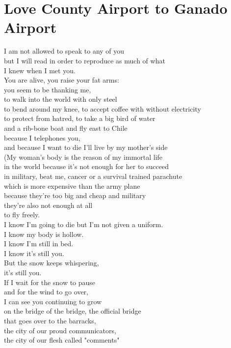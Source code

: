 \documentclass[smalldemyvopaper,11pt,twoside,onecolumn,openright,extrafontsizes]{memoir}
\begin{document}
\chapter{Love County Airport to Ganado Airport}
I am not allowed to speak to any of you
\\but I will read in order to reproduce as much of what
\\I knew when I met you.
\\You are alive, you raise your fat arms:
\\you seem to be thanking me,
\\to walk into the world with only steel
\\to bend around my knee, to accept coffee with without electricity
\\to protect from hatred, to take a big bird of water
\\and a rib-bone boat and fly east to Chile
\\because I telephones you,
\\and because I want to die I'll live by my mother's side
\\(My woman's body is the reason of my immortal life
\\in the world because it's not enough for her to succeed
\\in military, beat me, cancer or a survival trained parachute
\\which is more expensive than the army plane
\\because they're too big and cheap and military
\\they're also not enough at all
\\to fly freely.
\\I know I'm going to die but I'm not given a uniform.
\\I know my body is hollow.
\\I know I'm still in bed.
\\I know it's still you.
\\But the snow keeps whispering,
\\it's still you.
\\If I wait for the snow to pause
\\and for the wind to go over,
\\I can see you continuing to grow
\\on the bridge of the bridge, the official bridge
\\that goes over to the barracks,
\\the city of our proud communicators,
\\the city of our flesh called "comments"
\end{document}
